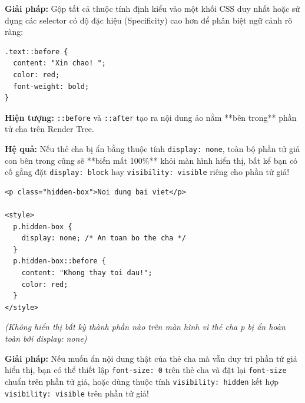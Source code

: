 \documentclass[11pt,oneside]{book}
\newcommand{\codeinline}[1]{\textcolor{accentOrange}{\texttt{#1}}}
\begin{document}
\begin{tipBox}
\textbf{Giải pháp:} Gộp tất cả thuộc tính định kiểu vào một khối CSS duy nhất hoặc sử dụng các selector có độ đặc hiệu (Specificity) cao hơn để phân biệt ngữ cảnh rõ ràng:
\begin{codeWindow}
\begin{lstlisting}[language=CSS3]
.text::before {
  content: "Xin chao! ";
  color: red;
  font-weight: bold;
}
\end{lstlisting}
\end{codeWindow}
\end{tipBox}

\begin{conceptBox}
\textbf{Hiện tượng:} \codeinline{::before} và \codeinline{::after} tạo ra nội dung ảo nằm **bên trong** phần tử cha trên Render Tree.
\par\vspace{4pt}
\textbf{Hệ quả:} Nếu thẻ cha bị ẩn bằng thuộc tính \codeinline{display: none}, toàn bộ phần tử giả con bên trong cũng sẽ **biến mất 100\%** khỏi màn hình hiển thị, bất kể bạn có cố gắng đặt \codeinline{display: block} hay \codeinline{visibility: visible} riêng cho phần tử giả!
\end{conceptBox}

\begin{codeWindow}
\begin{lstlisting}[language=HTML5]
<p class="hidden-box">Noi dung bai viet</p>

<style>
  p.hidden-box {
    display: none; /* An toan bo the cha */
  }
  p.hidden-box::before {
    content: "Khong thay toi dau!";
    color: red;
  }
</style>
\end{lstlisting}
\end{codeWindow}

\begin{browserWindow}
\sffamily\small
\textit{(Không hiển thị bất kỳ thành phần nào trên màn hình vì thẻ cha p bị ẩn hoàn toàn bởi display: none)}
\end{browserWindow}

\begin{tipBox}
\textbf{Giải pháp:} Nếu muốn ẩn nội dung thật của thẻ cha mà vẫn duy trì phần tử giả hiển thị, bạn có thể thiết lập \codeinline{font-size: 0} trên thẻ cha và đặt lại \codeinline{font-size} chuẩn trên phần tử giả, hoặc dùng thuộc tính \codeinline{visibility: hidden} kết hợp \codeinline{visibility: visible} trên phần tử giả!
\end{tipBox}
\end{document}
